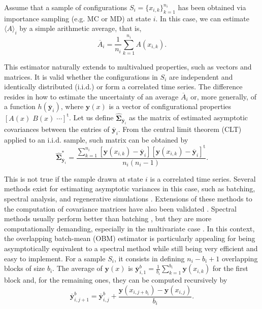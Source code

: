 \documentclass[journal=jctcce,manuscript=article,layout=twocolumn]{achemso}
\newcommand{\mt}[1]{\boldsymbol{\mathbf{#1}}}   %
\newcommand{\vt}[1]{\boldsymbol{\mathbf{#1}}}   %
\newcommand{\tr}[1]{#1^\text{t}}                %
\newcommand{\avg}[1]{\overline{#1}}             %
\begin{document}
Assume that a sample of configurations $S_i = \{x_{i,k}\}_{k=1}^{n_i}$ has been obtained via importance sampling \cite{Allen_1987} (e.g. MC or MD) at state $i$. In this case, we can estimate $\langle A \rangle_i$ by a simple arithmetic average, that is,
\begin{equation}
\label{eq:average estimator}
\avg A_i = \frac{1}{n_i} \sum_{k=1}^{n_i} A(x_{i,k}).
\end{equation}

This estimator naturally extends to multivalued properties, such as vectors and matrices. It is valid whether the configurations in $S_i$ are independent and identically distributed (i.i.d.) or form a correlated time series. The difference resides in how to estimate the uncertainty of an average $\avg A_i$ or, more generally, of a function $h(\avg {\vt y}_i)$, where $\vt y(x)$ is a vector of configurational properties $\tr{[A(x) \; B(x) \; \cdots]}$. Let us define $\hat{\mt \Sigma}_{\avg{\vt y}_i}$ as the matrix of estimated asymptotic covariances between the entries of $\avg{\vt y}_i$. From the central limit theorem (CLT) applied to an i.i.d. sample, such matrix can be obtained by
\begin{equation*}
\label{eq:asymptotic covariance IID}
\hat{\mt \Sigma}^\ast_{\avg{\vt y}_i} = \frac{\sum\limits_{k=1}^{n_i} \left[\vt y(x_{i,k}) - \avg{\vt y}_i\right] \tr{\left[\vt y(x_{i,k}) - \avg{\vt y}_i\right]}}{n_i(n_i - 1)}.
\end{equation*}

This is not true if the sample drawn at state $i$ is a correlated time series. Several methods exist for estimating asymptotic variances in this case, such as batching, spectral analysis, and regenerative simulations \cite{Geyer_1992, Alexopoulos_2006, Flegal_2010, Doss_2014}. Extensions of these methods to the computation of covariance matrices have also been validated \cite{Vats_2015, Vats_2017}. Spectral methods usually perform better than batching \cite{Flegal_2010}, but they are more computationally demanding, especially in the multivariate case \cite{Vats_2015}. In this context, the overlapping batch-mean (OBM) estimator \cite{Meketon_1984} is particularly appealing for being asymptotically equivalent to a spectral method while still being very efficient and easy to implement. For a sample $S_i$, it consists in defining $n_i-b_i+1$ overlapping blocks of size $b_i$. The average of $\vt y(x)$ is ${\avg{\vt y}}^b_{i,1} = \frac{1}{b_i} \sum_{k=1}^{b_i} \vt y(x_{i,k})$ for the first block and, for the remaining ones, they can be computed recursively by
\begin{equation*}
{\avg{\vt y}}^b_{i,j+1} = {\avg{\vt y}}^b_{i,j} + \frac{\vt y(x_{i,j+b_i}) - \vt y(x_{i,j})}{b_i}.
\end{equation*}
\end{document}

